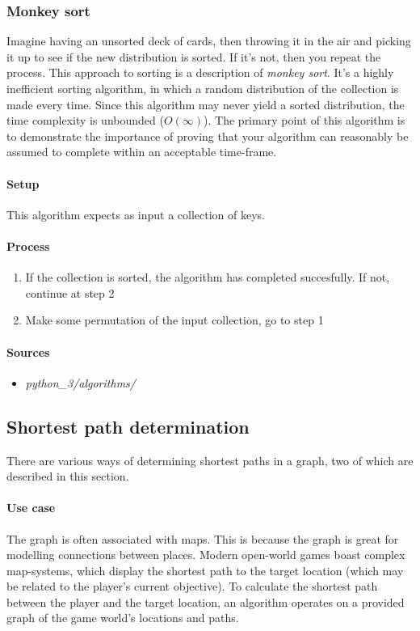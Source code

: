 \documentclass{article}
\begin{document}
\subsubsection{Monkey sort}
Imagine having an unsorted deck of cards, then throwing it in the air and picking it up to see if the new
distribution is sorted. If it's not, then you repeat the process. This approach to sorting is a description of
{\em monkey sort}. It's a highly inefficient sorting algorithm, in which a random distribution of the collection
is made every time. Since this algorithm may never yield a sorted distribution, the time complexity is unbounded
(\(O(\infty)\)). The primary point of this algorithm is to demonstrate the importance of
proving that your algorithm can reasonably be assumed to complete within an acceptable time-frame.

\paragraph{Setup}
This algorithm expects as input a collection of keys.

\paragraph{Process}
\begin{enumerate}
\item{If the collection is sorted, the algorithm has completed succesfully. If not, continue at step 2}
\item{Make some permutation of the input collection, go to step 1}
\end{enumerate}

\begin{samepage}
  \paragraph{Sources}
  \begin{itemize}
  \item{{\em python\_3/algorithms/}}
  \end{itemize}
\end{samepage}


\subsection{Shortest path determination}
There are various ways of determining shortest paths in a graph, two of which are described in this section.

\paragraph{Use case}
The graph is often associated with maps. This is because the graph is great for modelling connections between places. Modern
open-world games boast complex map-systems, which display the shortest path to the target location (which may be related to the
player's current objective). To calculate the shortest path between the player and the target location, an algorithm operates on
a provided graph of the game world's locations and paths.
\end{document}
